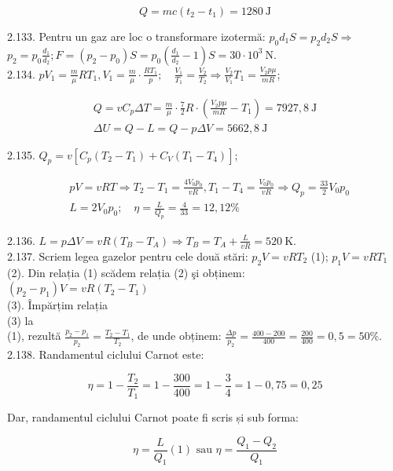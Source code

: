 \documentclass[10pt]{article}
\begin{document}
$$
Q=m c\left(t_{2}-t_{1}\right)=1280 \mathrm{~J}
$$

2.133. Pentru un gaz are loc o transformare izotermă: $p_{0} d_{1} S=p_{2} d_{2} S \Rightarrow$ $p_{2}=p_{0} \frac{d_{1}}{d_{2}} ; F=\left(p_{2}-p_{0}\right) S=p_{0}\left(\frac{d_{1}}{d_{2}}-1\right) S=30 \cdot 10^{3} \mathrm{~N}$.\\
2.134. $p V_{1}=\frac{m}{\mu} R T_{1}, V_{1}=\frac{m}{\mu} \cdot \frac{R T_{1}}{p} ; \quad \frac{V_{1}}{T_{1}}=\frac{V_{2}}{T_{2}} \Rightarrow \frac{V_{2}}{V_{1}} T_{1}=\frac{V_{2} p \mu}{m R}$;

$$
\begin{gathered}
Q=v C_{p} \Delta T=\frac{m}{\mu} \cdot \frac{7}{2} R \cdot\left(\frac{V_{2} p \mu}{m R}-T_{1}\right)=7927,8 \mathrm{~J} \\
\Delta U=Q-L=Q-p \Delta V=5662,8 \mathrm{~J}
\end{gathered}
$$

2.135. $Q_{p}=v\left[C_{p}\left(T_{2}-T_{1}\right)+C_{V}\left(T_{1}-T_{4}\right)\right]$;

$$
\begin{aligned}
& p V=v R T \Rightarrow T_{2}-T_{1}=\frac{4 V_{0} p_{0}}{v R}, T_{1}-T_{4}=\frac{V_{0} p_{0}}{v R} \Rightarrow Q_{p}=\frac{33}{2} V_{0} p_{0} \\
& L=2 V_{0} p_{0} ; \quad \eta=\frac{L}{Q_{p}}=\frac{4}{33}=12,12 \%
\end{aligned}
$$

2.136. $L=p \Delta V=v R\left(T_{B}-T_{A}\right) \Rightarrow T_{B}=T_{A}+\frac{L}{v R}=520 \mathrm{~K}$.\\
2.137. Scriem legea gazelor pentru cele două stări: $p_{2} V=v R T_{2}$ (1); $p_{1} V=v R T_{1}$ (2). Din relația (1) scădem relația (2) şi obținem:\\
$\left(p_{2}-p_{1}\right) V=v R\left(T_{2}-T_{1}\right)$\\
(3). Împărțim relația\\
(3) la\\
(1), rezultă $\frac{p_{2}-p_{1}}{p_{2}}=\frac{T_{2}-T_{1}}{T_{2}}$, de unde obținem: $\frac{\Delta p}{p_{2}}=\frac{400-200}{400}=\frac{200}{400}=0,5=50 \%$.\\
2.138. Randamentul ciclului Carnot este:

$$
\eta=1-\frac{T_{2}}{T_{1}}=1-\frac{300}{400}=1-\frac{3}{4}=1-0,75=0,25
$$

Dar, randamentul ciclului Carnot poate fi scris și sub forma:


\begin{equation*}
\eta=\frac{L}{Q_{1}}(1) \text { sau } \eta=\frac{Q_{1}-Q_{2}}{Q_{1}} \tag{2}
\end{equation*}
\end{document}
